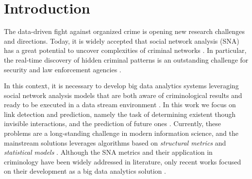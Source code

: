 \section{Introduction}
\label{sec:introduction}

The data-driven fight against organized crime is opening new research challenges and directions. 
Today, it is widely accepted that social network analysis (SNA) has a great potential to uncover complexities of criminal networks \cite{berlusconi2017social}.
In particular, the real-time discovery of hidden criminal patterns is an outstanding challenge for security and law enforcement agencies \cite{berlusconi2016link}.

In this context, it is necessary to develop big data analytics systems leveraging social network analysis models that are both aware of criminological results and ready to be executed in a data stream environment \cite{xu2005criminal,xu2004analyzing}.
In this work we focus on link detection and prediction, namely the task of determining existent though invisible interactions, and the prediction of future ones \cite{Hasan2011}.
Currently, these problems are a long-standing challenge in modern information science, and the mainstream solutions leverages algorithms based on 
\textit{structural metrics} and \textit{statistical models} \cite{berlusconi2016link,Liben-Nowell,Lu2011}.
Although the SNA metrics and their application in criminology have been widely addressed in literature, only recent works focused on their development as a big data analytics solution \cite{pramanik2016framework}.

 



